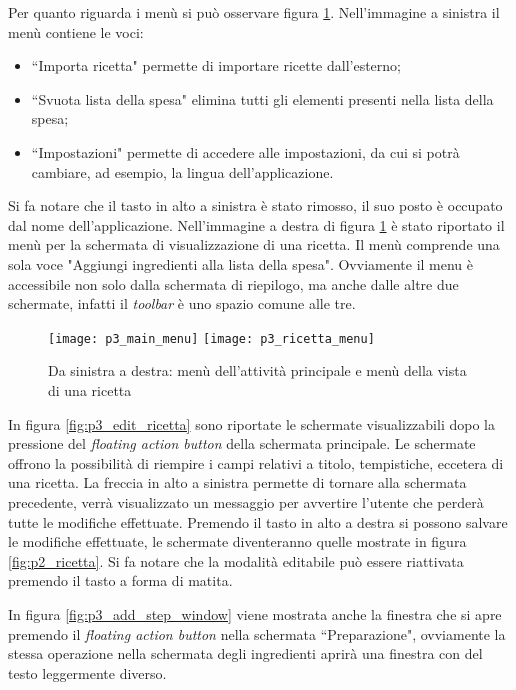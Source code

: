 Per quanto riguarda i menù si può osservare figura \ref{fig:p3_menu}.
Nell'immagine a sinistra il menù contiene le voci:
\begin{itemize}
  \item ``Importa ricetta" permette di importare ricette dall'esterno;
  \item ``Svuota lista della spesa" elimina tutti gli elementi presenti nella lista della spesa;
  \item ``Impostazioni" permette di accedere alle impostazioni, da cui si potrà cambiare, ad esempio, la lingua dell'applicazione.
\end{itemize}
Si fa notare che il tasto in alto a sinistra è stato rimosso, il suo posto è occupato dal nome dell'applicazione.
Nell'immagine a destra di figura \ref{fig:p3_menu} è stato riportato il menù per la schermata di visualizzazione di una ricetta.
Il menù comprende una sola voce "Aggiungi ingredienti alla lista della spesa".
Ovviamente il menu è accessibile non solo dalla schermata di riepilogo, ma anche dalle altre due schermate, infatti il \textit{toolbar} è uno spazio comune alle tre.
\begin{figure}[ht]
  \begin{center}
    \texttt{[image: p3\_main\_menu]}
    \texttt{[image: p3\_ricetta\_menu]}
    \caption{Da sinistra a destra: menù dell'attività principale e menù della vista di una ricetta}
    \label{fig:p3_menu}
  \end{center}
\end{figure}
\clearpage

In figura \ref{fig:p3_edit_ricetta} sono riportate le schermate visualizzabili dopo la pressione del \textit{floating action button} della schermata principale.
Le schermate offrono la possibilità di riempire i campi relativi a titolo, tempistiche, eccetera di una ricetta.
La freccia in alto a sinistra permette di tornare alla schermata precedente, verrà visualizzato un messaggio per avvertire l'utente che perderà tutte le modifiche effettuate.
Premendo il tasto in alto a destra si possono salvare le modifiche effettuate, le schermate diventeranno quelle mostrate in figura \ref{fig:p2_ricetta}.
Si fa notare che la modalità editabile può essere riattivata premendo il tasto a forma di matita.


In figura \ref{fig:p3_add_step_window} viene mostrata anche la finestra che si apre premendo il \textit{floating action button} nella schermata ``Preparazione", ovviamente la stessa operazione nella schermata degli ingredienti aprirà una finestra con del testo leggermente diverso.

